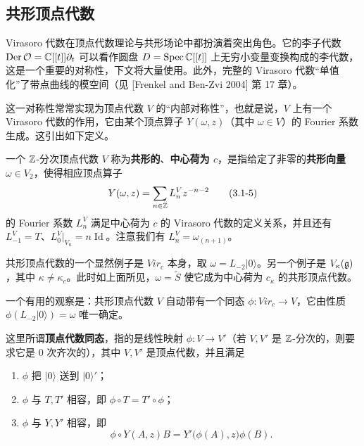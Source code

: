 \subsection{共形顶点代数}

Virasoro 代数在顶点代数理论与共形场论中都扮演着突出角色。它的李子代数 $\operatorname{Der}\mathcal{O}=\mathbb{C}[[t]]\partial_t$ 可以看作圆盘 $D=\operatorname{Spec}\mathbb{C}[[t]]$ 上无穷小变量变换构成的李代数，这是一个重要的对称性，下文将大量使用。此外，完整的 Virasoro 代数“单值化”了带点曲线的模空间（见 [Frenkel and Ben-Zvi 2004] 第 17 章）。


这一对称性常常实现为顶点代数 $V$ 的“内部对称性”，也就是说，$V$ 上有一个 Virasoro 代数的作用，它由某个顶点算子 $Y(\omega,z)$（其中 $\omega\in V$）的 Fourier 系数生成。这引出如下定义。

一个 $\mathbb{Z}$-分次顶点代数 $V$ 称为\textbf{共形的}、\textbf{中心荷为 $c$}，是指给定了非零的\textbf{共形向量} $\omega\in V_2$，使得相应顶点算子
\begin{equation}
    Y(\omega,z) = \sum_{n\in\mathbb{Z}} L^V_n z^{-n-2}
    \tag{3.1-5}
\end{equation}
的 Fourier 系数 $L^V_n$ 满足中心荷为 $c$ 的 Virasoro 代数的定义关系，并且还有 $L^V_{-1}=T$、$L^V_0|_{V_n}=n\operatorname{Id}$。注意我们有 $L^V_n=\omega_{(n+1)}$。

共形顶点代数的一个显然例子是 $\mathit{Vir}_c$ 本身，取 $\omega=L_{-2}|0\rangle$。另一个例子是 $V_\kappa(\mathfrak{g})$，其中 $\kappa\neq\kappa_c$。此时如上面所见，$\omega=\widetilde S$ 使它成为中心荷为 $c_\kappa$ 的共形顶点代数。

一个有用的观察是：共形顶点代数 $V$ 自动带有一个同态 $\phi:\mathit{Vir}_c\to V$，它由性质 $\phi(L_{-2}|0\rangle)=\omega$ 唯一确定。

这里所谓\textbf{顶点代数同态}，指的是线性映射 $\phi:V\to V'$（若 $V,V'$ 是 $\mathbb{Z}$-分次的，则要求它是 $0$ 次齐次的），其中 $V,V'$ 是顶点代数，并且满足
\begin{enumerate}[label=(\arabic*),leftmargin=2.2em,itemsep=1pt,topsep=2pt]
    \item $\phi$ 把 $|0\rangle$ 送到 $|0\rangle'$；
    \item $\phi$ 与 $T,T'$ 相容，即 $\phi\circ T=T'\circ\phi$；
    \item $\phi$ 与 $Y,Y'$ 相容，即
    \[
        \phi\circ Y(A,z)B = Y'\bigl(\phi(A),z\bigr)\phi(B).
    \]
\end{enumerate}

